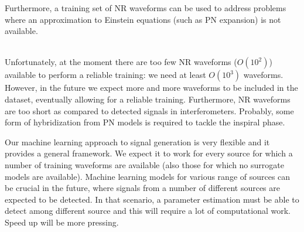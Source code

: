 Furthermore, a training set of NR waveforms can be used to address problems where an approximation to Einstein equations (such as PN expansion) is not available.
\par
{}\\
Unfortunately, at the moment there are too few NR waveforms ($O(10^2)$) available to perform a reliable training: we need at least $O(10^3)$ waveforms. However, in the future we expect more and more waveforms to be included in the dataset, eventually allowing for a reliable training.
Furthermore, NR waveforms are too short as compared to detected signals in interferometers. Probably, some form of hybridization from PN models is required to tackle the inspiral phase.
\par
Our machine learning approach to signal generation is very flexible and it provides a general framework. We expect it to work for every source for which a number of training waveforms are available (also those for which no surrogate models are available).
Machine learning models for various range of sources can be crucial in the future, where signals from a number of different sources are expected to be detected. In that scenario, a parameter estimation must be able to detect among different source and this will require a lot of computational work. Speed up will be more pressing.












